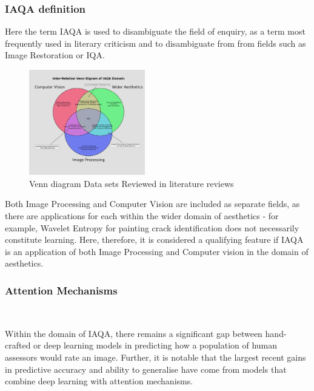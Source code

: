 \newpage

\subsubsection{IAQA definition}

Here the term IAQA is used to disambiguate the field of enquiry, as a term most frequently used in literary criticism and to disambiguate from from fields such as Image Restoration or IQA.

\begin{figure}
\specialrule{0.01em}{0.2em}{0.2em}
     \begin{center}
     \includegraphics[width=0.45\textwidth]{figures/introduction/inter-relation_of_subjects.png}    
     \caption{Venn diagram Data sets Reviewed in literature reviews }
     \label{fig:IAQAVenn}
  \specialrule{0.01em}{0.2em}{0.2em}
  \end{center}
 \end{figure}
\par Both Image Processing and Computer Vision are included as separate fields, as there are applications for each within the wider domain of aesthetics - for example, Wavelet Entropy for painting crack identification does not necessarily constitute learning. Here, therefore, it is considered a qualifying feature if IAQA is an application of both Image Processing and Computer vision in the domain of aesthetics\cite{Constatantin2020}. 
\subsubsection{Attention Mechanisms}\\
\par
Within the domain of IAQA, there remains a significant gap between hand-crafted or deep learning models in predicting how a population of human assessors would rate  an image. Further, it is notable that the largest recent gains in predictive accuracy and ability to generalise have come from models that combine deep learning with attention mechanisms. 

